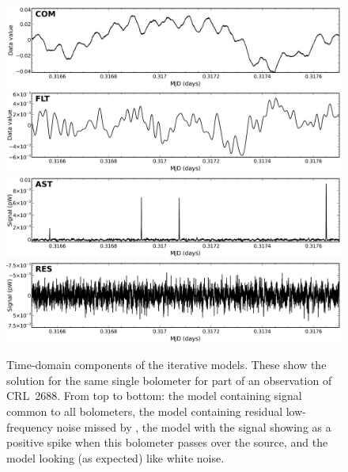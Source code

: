 \documentclass[11pt,oneside,chapters]{starlink}
\begin{document}
\begin{figure}
\begin{center}
\begin{latexonly}
  \includegraphics[width=\linewidth]{sc21_com} \\
  \includegraphics[width=\linewidth]{sc21_flt} \\
  \includegraphics[width=\linewidth]{sc21_ast} \\
  \includegraphics[width=\linewidth]{sc21_res} \\
\end{latexonly}
\end{center}
\caption[Iterative models in the time domain]{\small Time-domain
components of the iterative models. These show the solution for the
same single bolometer for part of an observation of CRL~2688. From top
to bottom: the  model containing signal common to all
bolometers, the  model containing residual low-frequency
noise missed by , the  model with the signal
showing as a positive spike when this bolometer passes over the
source, and the  model looking (as expected) like white
noise.}
\label{fig:itercomp}
\end{figure}
\end{document}
